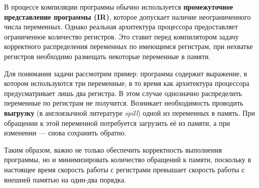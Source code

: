 В процессе компиляции программы обычно используется \textbf{промежуточное представление программы (IR)}, которое допускает
наличие неограниченного числа переменных. Однако реальная архитектура процессора предоставляет ограниченное
количество регистров. Это ставит перед компилятором задачу корректного распределения переменных по имеющимся
регистрам, при нехватке регистров необходимо размещать некоторые переменные в памяти. %

Для понимания задачи рассмотрим пример: программа содержит выражение, в котором используются три переменные,
в то время как архитектура процессора предусматривает лишь два регистра.
В этом случае однозначно распределить переменные по регистрам не получится.
Возникает необходимость проводить \textbf{выгрузку} (в англоязычной литературе \textit{spill})
одной из переменных в память. При обращении к этой переменной потребуется загрузить
её из памяти, а при изменении — снова сохранить обратно.

Таким образом, важно не только обеспечить корректность выполнения программы, но и минимизировать количество обращений к памяти,
поскольку в настоящее время скорость работы с регистрами превышает скорость работы с внешней памятью на один-два порядка.
